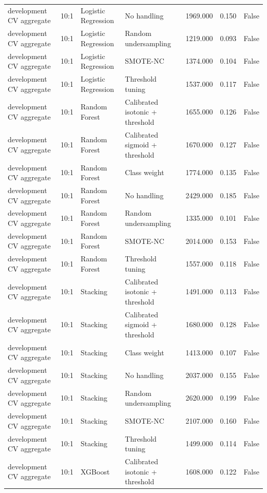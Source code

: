 \begin{tabular}{llllrrr}
development CV aggregate & 10:1 & Logistic Regression & No handling & 1969.000 & 0.150 & False \\
development CV aggregate & 10:1 & Logistic Regression & Random undersampling & 1219.000 & 0.093 & False \\
development CV aggregate & 10:1 & Logistic Regression & SMOTE-NC & 1374.000 & 0.104 & False \\
development CV aggregate & 10:1 & Logistic Regression & Threshold tuning & 1537.000 & 0.117 & False \\
development CV aggregate & 10:1 & Random Forest & Calibrated isotonic + threshold & 1655.000 & 0.126 & False \\
development CV aggregate & 10:1 & Random Forest & Calibrated sigmoid + threshold & 1670.000 & 0.127 & False \\
development CV aggregate & 10:1 & Random Forest & Class weight & 1774.000 & 0.135 & False \\
development CV aggregate & 10:1 & Random Forest & No handling & 2429.000 & 0.185 & False \\
development CV aggregate & 10:1 & Random Forest & Random undersampling & 1335.000 & 0.101 & False \\
development CV aggregate & 10:1 & Random Forest & SMOTE-NC & 2014.000 & 0.153 & False \\
development CV aggregate & 10:1 & Random Forest & Threshold tuning & 1557.000 & 0.118 & False \\
development CV aggregate & 10:1 & Stacking & Calibrated isotonic + threshold & 1491.000 & 0.113 & False \\
development CV aggregate & 10:1 & Stacking & Calibrated sigmoid + threshold & 1680.000 & 0.128 & False \\
development CV aggregate & 10:1 & Stacking & Class weight & 1413.000 & 0.107 & False \\
development CV aggregate & 10:1 & Stacking & No handling & 2037.000 & 0.155 & False \\
development CV aggregate & 10:1 & Stacking & Random undersampling & 2620.000 & 0.199 & False \\
development CV aggregate & 10:1 & Stacking & SMOTE-NC & 2107.000 & 0.160 & False \\
development CV aggregate & 10:1 & Stacking & Threshold tuning & 1499.000 & 0.114 & False \\
development CV aggregate & 10:1 & XGBoost & Calibrated isotonic + threshold & 1608.000 & 0.122 & False \\

\end{tabular}
